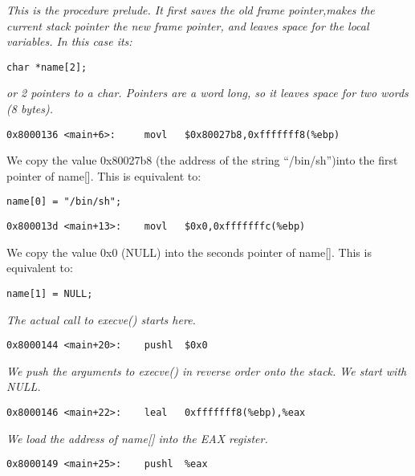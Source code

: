 \documentclass[a4paper]{article}
\begin{document}
\textit{This is the procedure prelude. It first saves the old frame pointer,makes the current stack pointer the new frame pointer, and leaves space for the local variables. In this case its:
}

\texttt{char *name[2];}

\textit{or 2 pointers to a char. Pointers are a word long, so it leaves space for two words (8 bytes).}

\begin{verbatim}
0x8000136 <main+6>:     movl   $0x80027b8,0xfffffff8(%ebp)
\end{verbatim}

We copy the value 0x80027b8 (the address of the string “/bin/sh”)into the first pointer of name[]. This is equivalent to:

\texttt{name[0] = "/bin/sh";}

\begin{verbatim}
0x800013d <main+13>:    movl   $0x0,0xfffffffc(%ebp)
\end{verbatim}

We copy the value 0x0 (NULL) into the seconds pointer of name[]. This is equivalent to:

\texttt{name[1] = NULL;}

\textit{The actual call to execve() starts here.}

\begin{verbatim}
0x8000144 <main+20>:    pushl  $0x0
\end{verbatim}

\textit{We push the arguments to execve() in reverse order onto the stack. We start with NULL.
}
\begin{verbatim}
0x8000146 <main+22>:    leal   0xfffffff8(%ebp),%eax
\end{verbatim}

\textit{We load the address of name[] into the EAX register.
}

\begin{verbatim}
0x8000149 <main+25>:    pushl  %eax
\end{verbatim}
\end{document}
